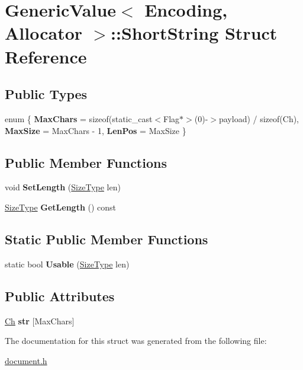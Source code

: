 \hypertarget{a02092}{}\section{Generic\+Value$<$ Encoding, Allocator $>$\+:\+:Short\+String Struct Reference}
\label{a02092}
\subsection*{Public Types}
\begin{DoxyCompactItemize}
\item 
\mbox{\label{a02092_a6e60100ae63574bcea80c878f757da91}} 
enum \{ {\bfseries Max\+Chars} = sizeof(static\+\_\+cast$<$Flag$\ast$$>$(0)-\/$>$payload) / sizeof(Ch), 
{\bfseries Max\+Size} = Max\+Chars -\/ 1, 
{\bfseries Len\+Pos} = Max\+Size
 \}
\end{DoxyCompactItemize}
\subsection*{Public Member Functions}
\begin{DoxyCompactItemize}
\item 
\mbox{\label{a02092_adbfe8461e0cb0ccb2cb3825489e743c2}} 
void {\bfseries Set\+Length} (\hyperlink{a00560_a5ed6e6e67250fadbd041127e6386dcb5}{Size\+Type} len)
\item 
\mbox{\label{a02092_a4aa295331ab0d019fd64f8f5d57d450b}} 
\hyperlink{a00560_a5ed6e6e67250fadbd041127e6386dcb5}{Size\+Type} {\bfseries Get\+Length} () const
\end{DoxyCompactItemize}
\subsection*{Static Public Member Functions}
\begin{DoxyCompactItemize}
\item 
\mbox{\label{a02092_a73e40f625c1abbd84f95ac7fff8365f7}} 
static bool {\bfseries Usable} (\hyperlink{a00560_a5ed6e6e67250fadbd041127e6386dcb5}{Size\+Type} len)
\end{DoxyCompactItemize}
\subsection*{Public Attributes}
\begin{DoxyCompactItemize}
\item 
\mbox{\label{a02092_a444e24523d4cc33830d18a2cfcfd333b}} 
\hyperlink{a01992_ade0e0ce64ccd5d852da57a35e720bafb}{Ch} {\bfseries str} \mbox{[}Max\+Chars\mbox{]}
\end{DoxyCompactItemize}


The documentation for this struct was generated from the following file\+:\begin{DoxyCompactItemize}
\item 
\hyperlink{a00476}{document.\+h}\end{DoxyCompactItemize}
